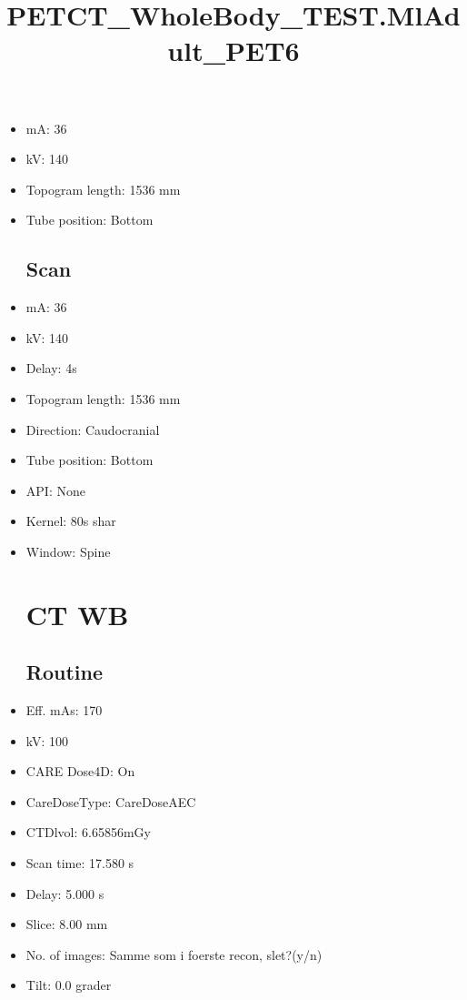 \documentclass[12pt]{article}
\title{PETCT\_WholeBody\_TEST.MlAdult\_PET6}
\begin{document}
\maketitle
\newpage
\tableofcontents
\newpage
{}


\begin{itemize}[noitemsep]\section{Topogram}
\subsection{Routine}
\item mA: 36\item kV: 140\item Topogram length: 1536 mm\item Tube position: Bottom
\subsection{Scan}\item mA: 36\item kV: 140\item Delay: 4s\item Topogram length: 1536 mm\item Direction: Caudocranial\item Tube position: Bottom\item API: None\item Kernel: 80s shar\item Window: Spine
\section{CT WB}
\subsection{Routine}
\item Eff. mAs: 170\item kV: 100\item CARE Dose4D: On\item CareDoseType: CareDoseAEC\item CTDlvol: 6.65856mGy\item Scan time: 17.580 s\item Delay: 5.000 s\item Slice: 8.00 mm\item No. of images: Samme som i foerste recon, slet?(y/n)\item Tilt: 0.0 grader

\end{itemize}
\end{document}
